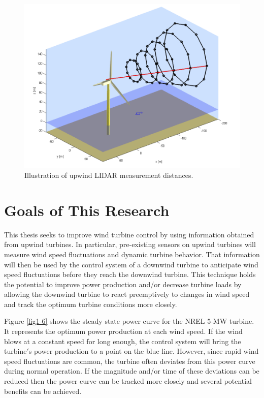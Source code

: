 \begin{figure}[htbp]
	\centering
		\includegraphics[width=.75\linewidth]{Figures/ch1Figures/fig1-5.png}
	\caption{Illustration of upwind LIDAR measurement distances.\cite{schlipf2011}}
	\label{fig1-5}
\end{figure}


\section{Goals of This Research} 

This thesis seeks to improve wind turbine control by using information obtained from upwind turbines.  In particular, pre-existing sensors on upwind turbines will measure wind speed fluctuations and dynamic turbine behavior.  That information will then be used by the control system of a downwind turbine to anticipate wind speed fluctuations before they reach the downwind turbine.  This technique holds the potential to improve power production and/or decrease turbine loads by allowing the downwind turbine to react preemptively to changes in wind speed and track the optimum turbine conditions more closely.

Figure \ref{fig1-6} shows the steady state power curve for the NREL 5-MW turbine.  It represents the optimum power production at each wind speed.  If the wind blows at a constant speed for long enough, the control system will bring the turbine$'$s power production to a point on the blue line.  However, since rapid wind speed fluctuations are common, the turbine often deviates from this power curve during normal operation.  If the magnitude and/or time of these deviations can be reduced then the power curve can be tracked more closely and several potential benefits can be achieved.


